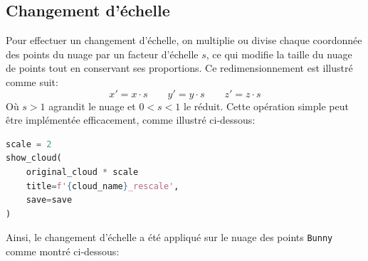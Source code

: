 \documentclass[../5RO17_TP4.tex]{subfiles}
\begin{document}
\subsection{Changement d'échelle}
\noindent Pour effectuer un changement d’échelle, on multiplie ou divise chaque coordonnée des points du nuage par un facteur d’échelle $s$, ce qui modifie la taille du nuage de points tout en conservant ses proportions. Ce redimensionnement est illustré comme suit:
\begin{equation}
    x' = x \cdot s
    \qquad
    y' = y \cdot s
    \qquad
    z' = z \cdot s
\end{equation}
\noindent Où $s>1$ agrandit le nuage et $0<s<1$ le réduit. Cette opération simple peut être implémentée efficacement, comme illustré ci-dessous:\\
\begin{scriptsize}\mycode
	\begin{lstlisting}[language=Python, caption=\texttt{rescale()}]
scale = 2
show_cloud(
    original_cloud * scale
    title=f'{cloud_name}_rescale',
    save=save
)
	\end{lstlisting}
\end{scriptsize}
\noindent Ainsi, le changement d'échelle a été appliqué sur le nuage des points \texttt{Bunny} comme montré ci-dessous:
\end{document}

